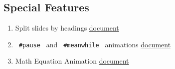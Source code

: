 \subsection{Special Features}\label{special-features}

\begin{enumerate}
\tightlist
\item
  Split slides by headings
  \href{https://touying-typ.github.io/docs/sections}{document}
\end{enumerate}

\begin{Shaded}
\begin{Highlighting}[]





\end{Highlighting}
\end{Shaded}

\begin{enumerate}
\setcounter{enumi}{1}
\tightlist
\item
  \texttt{\ \#pause\ } and \texttt{\ \#meanwhile\ } animations
  \href{https://touying-typ.github.io/docs/dynamic/simple}{document}
\end{enumerate}

\begin{Shaded}
\begin{Highlighting}[]
\NormalTok{\#slide[}






\NormalTok{]}
\end{Highlighting}
\end{Shaded}


\begin{enumerate}
\setcounter{enumi}{2}
\tightlist
\item
  Math Equation Animation
  \href{https://touying-typ.github.io/docs/dynamic/equation}{document}
\end{enumerate}

